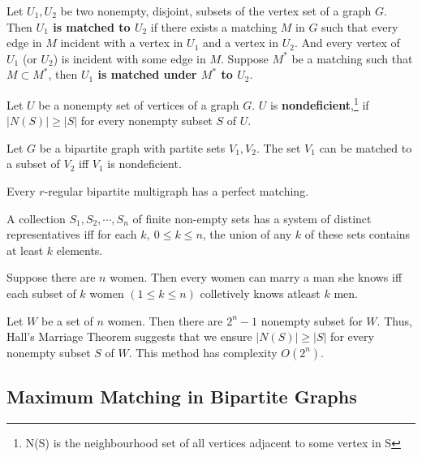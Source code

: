 \begin{definition}
	Let $U_1,U_2$ be two nonempty, disjoint, subsets of the vertex set of a graph $G$.
	Then \textbf{$U_1$ is matched to $U_2$} if there exists a matching $M$ in $G$ such that every edge in $M$ incident with a vertex in $U_1$ and a vertex in $U_2$.
	And every vertex of $U_1$ (or $U_2$) is incident with some edge in $M$.
	Suppose $M^*$ be a matching such that $M \subset M^*$, then \textbf{$U_1$ is matched under $M^*$ to $U_2$}.
\end{definition}

\begin{definition}
	Let $U$ be a nonempty set of vertices of a graph $G$.
	$U$ is \textbf{nondeficient},\footnote{N(S) is the neighbourhood set of all vertices adjacent to some vertex in S} if $|N(S)| \ge |S|$ for every nonempty subset $S$ of $U$.
\end{definition}

\begin{theorem}
	Let $G$ be a bipartite graph with partite sets $V_1,V_2$.
	The set $V_1$ can be matched to a subset of $V_2$ iff $V_1$ is nondeficient.
\end{theorem}
\begin{corollary}
	Every $r$-regular bipartite multigraph has a perfect matching.
\end{corollary}

\begin{theorem}
	A collection $S_1,S_2,\cdots,S_n$ of finite non-empty sets has a system of distinct representatives iff for each $k,\ 0 \le k \le n$, the union of any $k$ of these sets contains at least $k$ elements.
\end{theorem}

\begin{remark}
	Suppose there are $n$ women.
	Then every women can marry a man she knows iff each subset of $k$ women $(1 \le k \le n)$ colletively knows atleast $k$ men. 
\end{remark}

\begin{remark}
	Let $W$ be a set of $n$ women.
	Then there are $2^n-1$ nonempty subset for $W$.
	Thus, Hall's Marriage Theorem suggests that we ensure $|N(S)| \ge |S|$ for every nonempty subset $S$ of $W$.
	This method has complexity $O(2^n)$.
\end{remark}

\subsection{Maximum Matching in Bipartite Graphs}

